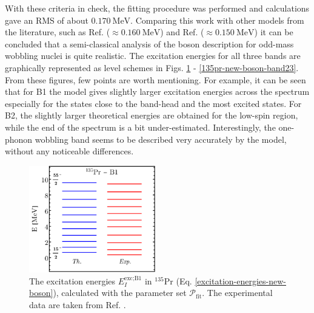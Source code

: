 With these criteria in check, the fitting procedure was performed and calculations gave an RMS of about $0.170\ \text{MeV}$. Comparing this work with other models from the literature, such as Ref. \cite{chen2016wobbling} ($\approx0.160\ \text{MeV}$) and Ref. \cite{budaca2018tilted} ($\approx0.150\ \text{MeV}$) it can be concluded that a semi-classical analysis of the boson description for odd-mass wobbling nuclei is quite realistic. The excitation energies for all three bands are graphically represented as level schemes in Figs. \ref{135pr-new-boson-band1} - \ref{135pr-new-boson-band23}. From these figures, few points are worth mentioning. For example, it can be seen that for B1 the model gives slightly larger excitation energies across the spectrum especially for the states close to the band-head and the most excited states. For B2, the slightly larger theoretical energies are obtained for the low-spin region, while the end of the spectrum is a bit under-estimated. Interestingly, the one-phonon wobbling band seems to be described very accurately by the model, without any noticeable differences. 
\begin{figure}[t] %
    \centering
    \includegraphics[width=0.49\textwidth]{Chapters/Figures/135Pr-New-Boson-Band1-Energies.pdf}
    \caption{The excitation energies $E_I^\text{exc;B1}$ in $^{135}$Pr (Eq. \ref{excitation-energies-new-boson}), calculated with the parameter set $\mathcal{P}_\text{fit}$. The experimental data are taken from Ref. \cite{sensharma2019two}.}
    \label{135pr-new-boson-band1}
\end{figure}
